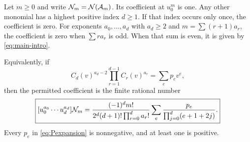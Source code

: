 \begin{theorem}\label{thm:universal}
Let $m\ge0$ and write $\mathcal N_m=\mathcal N(\mathcal A_m)$. Its coefficient at $u_0^m$ is one. Any other monomial has a highest positive index $d\ge1$. If that index occurs only once, the coefficient is zero. For exponents $a_0,\ldots,a_d$ with $a_d\ge2$ and $m=\sum(r+1)a_r$, the coefficient is zero when $\sum r a_r$ is odd. When that sum is even, it is given by \eqref{eq:main-intro}.

Equivalently, if
\begin{equation}\label{eq:Pexpansion}
 C_d(v)^{a_d-2}\prod_{r=1}^{d-1}C_r(v)^{a_r}
 =\sum_e p_e v^e,
\end{equation}
then the permitted coefficient is the finite rational number
\begin{equation}\label{eq:positive-beta}
 \boxed{\displaystyle
 [u_0^{a_0}\cdots u_d^{a_d}]\mathcal N_m
 =\frac{(-1)^d m!}{2^d(d+1)!\prod_{r=0}^d a_r!}
       \sum_e\frac{p_e}{\prod_{j=0}^d(e+1+2j)}.}
\end{equation}
Every $p_e$ in \eqref{eq:Pexpansion} is nonnegative, and at least one is positive.
\end{theorem}

